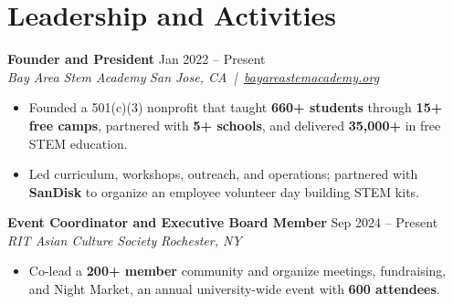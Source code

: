 \documentclass[10pt,letterpaper]{article}
\newif\ifresumeFirstRole
\newcommand{\resumeRole}[4]{%
  \ifresumeFirstRole
    \global\resumeFirstRolefalse
  \else
    \vspace{0pt plus 1fill}%
  \fi
  \textbf{#1} \hfill #2\\
  \textit{#3} \hfill \textit{#4}
}
\begin{document}
\section*{Leadership and Activities}
\resumeRole{Founder and President}{Jan 2022 -- Present}{Bay Area Stem Academy}{San Jose, CA \,|\, \href{https://bayareastemacademy.org}{bayareastemacademy.org}}
\begin{itemize}
  \item Founded a 501(c)(3) nonprofit that taught \textbf{660+ students} through \textbf{15+ free camps}, partnered with \textbf{5+ schools}, and delivered \textbf{\textdollar{}35,000+} in free STEM education.
  \item Led curriculum, workshops, outreach, and operations; partnered with \textbf{SanDisk} to organize an employee volunteer day building STEM kits.
\end{itemize}

\resumeRole{Event Coordinator and Executive Board Member}{Sep 2024 -- Present}{RIT Asian Culture Society}{Rochester, NY}
\begin{itemize}
  \item Co-lead a \textbf{200+ member} community and organize meetings, fundraising, and Night Market, an annual university-wide event with \textbf{600 attendees}.
\end{itemize}
\end{document}
